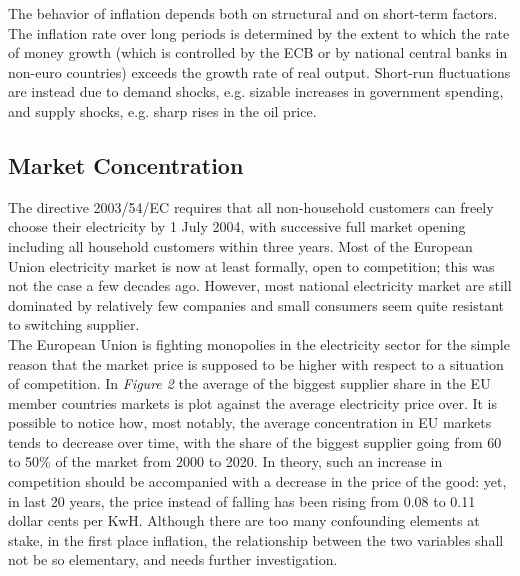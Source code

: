 \documentclass{book}
\begin{document}
The behavior of inflation depends both on structural and on short-term factors. The inflation rate over long periods is determined by the extent to which the rate of money growth (which is controlled by the ECB or by national central banks in non-euro countries) exceeds the growth rate of real output. Short-run fluctuations are instead due to demand shocks, e.g. sizable increases in government spending, and supply shocks, e.g. sharp rises in the oil price. \cite{ball1993causes}

\subsection*{Market Concentration}

The directive 2003/54/EC requires that all non-household customers can freely choose their electricity by 1 July 2004, with successive full market opening including all household customers within three years. Most of the European Union electricity market is now at least formally, open to competition; this was not the case a few decades ago. However, most national electricity market are still dominated by relatively few companies and small consumers seem quite resistant to switching supplier. \cite{jamasb2005electricity} \\

The European Union is fighting monopolies in the electricity sector for the simple reason that the market price is supposed to be higher with respect to a situation of competition. In \textit{Figure 2} the average of the biggest supplier share in the EU member countries markets is plot against the average electricity price over. It is possible to notice how, most notably, the average concentration in EU markets tends to decrease over time, with the share of the biggest supplier going from 60 to 50\% of the market from 2000 to 2020. In theory, such an increase in competition should be accompanied with a decrease in the price of the good: yet, in last 20 years, the price instead of falling has been rising from 0.08 to 0.11 dollar cents per KwH. Although there are too many confounding elements at stake, in the first place inflation, the relationship between the two variables shall not be so elementary, and needs further investigation.
\end{document}
